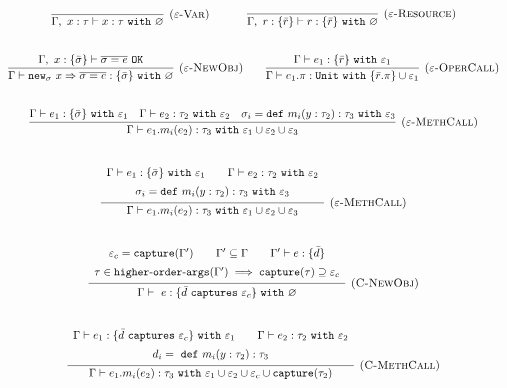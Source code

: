 \documentclass{llncs}
\newcommand{\keywadj}[1]{\mathtt{#1}}
\newcommand{\keyw}[1]{\keywadj{#1}~}
\newcommand{\kwa}[1]{\keywadj{ #1 }}
\newcommand{\hyphen}{\hbox{-}}
\newcommand{\type}[2]{
	#1~\keyw{with} #2
}
\newcommand{\newsig}[0]{
	\keywadj{new}_\sigma~x \Rightarrow \overline{\sigma = e}
}
\begin{document}
\noindent
\fbox{$\Gamma \vdash e : \tau~\keyw{with} \varepsilon$}

\[
\begin{array}{c}
	\infer[\textsc{($\varepsilon$-Var)}]
  {\Gamma,~x:\tau \vdash x: \type{\tau}{\varnothing} }
  {} 
~~~~~~~~~~
\infer[\textsc{($\varepsilon$-Resource)}]
  {\Gamma,~r :\{\bar r\} \vdash r: \type{   \{ \bar r \}  }{\varnothing}}
  {} \\[5ex]

\infer[\textsc{($\varepsilon$-NewObj)}]
	{\Gamma \vdash \newsig : \{ \bar \sigma \}~\keyw{with} \varnothing}
	{\Gamma,~x : \{ \bar \sigma \} \vdash \overline{\sigma = e}~\keywadj{OK}} ~~~~~~

\infer[\textsc{($\varepsilon$-OperCall)}]
	{\Gamma \vdash e_1.\pi : \keyw{Unit} \keyw{with} \{ \bar r.\pi \} \cup \varepsilon_1}
	{\Gamma \vdash e_1 : \{ \bar r \}~ \keyw{with} \varepsilon_1} \\[5ex]
	
\infer[\textsc{($\varepsilon$-MethCall)}]
	{\Gamma \vdash e_1.m_i(e_2):\tau_3~\keyw{with} \varepsilon_1 \cup \varepsilon_2 \cup \varepsilon_3}
	{\Gamma \vdash e_1 : \{ \bar \sigma \}~\keyw{with} \varepsilon_1 & \Gamma \vdash e_2 : \tau_2~\keyw{with} \varepsilon_2 & \sigma_i = \keyw{def} m_i(y:\tau_2):\tau_3~\keyw{with} \varepsilon_3} \\[5ex]
	
	
\infer[\textsc{($\varepsilon$-MethCall)}]
	{ \Gamma \vdash e_1.m_i(e_2) : \tau_3~ \keyw{with} \varepsilon_1 \cup \varepsilon_2 \cup \varepsilon_3 }
{{\def\arraystretch{1.4}
  \begin{array}{c}
\Gamma \vdash e_1 : \{ \bar \sigma \}~\keyw{with} \varepsilon_1
~~~~~~\Gamma \vdash e_2 : \tau_2~\keyw{with} \varepsilon_2 \\
\sigma_i = \keyw{def} m_i(y:\tau_2):\tau_3~\keyw{with} \varepsilon_3
  \end{array}}} \\[5ex]
 

\infer[\textsc{(C-NewObj)}]
	{\Gamma \vdash~e : \{  \bar d~\keyw{captures} \varepsilon_c \} ~\keyw{with} \varnothing }
	{{\def\arraystretch{1.4}
  \begin{array}{c}
\varepsilon_c = \kwa{capture}(\Gamma') ~~~~~~ \Gamma' \subseteq \Gamma ~~~~~~ \Gamma' \vdash e : \{ \bar d \} \\ \tau \in \kwa{higher \hyphen order \hyphen args}(\Gamma') \implies \kwa{capture}(\tau) \supseteq \varepsilon_c
  \end{array}}} \\[5ex]
	
\infer[\textsc{(C-MethCall)}]
	{ \Gamma \vdash e_1.m_i(e_2) : \tau_3~ \keyw{with} \varepsilon_1 \cup \varepsilon_2 \cup \varepsilon_c \cup \kwa{capture}(\tau_2) }
{{\def\arraystretch{1.4}
  \begin{array}{c}
\Gamma \vdash e_1 : \{ \bar d~\keyw{captures} \varepsilon_c \}~\keyw{with} \varepsilon_1
~~~~~~\Gamma \vdash e_2:\tau_2~\keyw{with} \varepsilon_2 \\
d_i =~\keyw{def} m_i(y:\tau_2):\tau_3
  \end{array}}} \\[5ex]
 
\end{array}
\]
\end{document}
